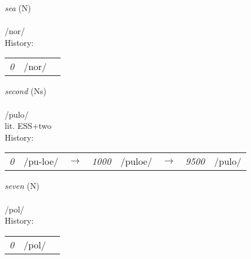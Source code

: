 \vspace{15pt}
\begin{nopagebreak}
 \textit{sea} (N)\\
\\
\noindent /n{\textprimstress}or/\\


\noindent History:

\vspace{-0pt}
\hspace{40pt}
\begin{tabular}{ccc}
\textit{0} & /nor/& \\
\end{tabular}

\vspace{20pt}\hline

\end{nopagebreak}
\filbreak



\vspace{15pt}
\begin{nopagebreak}
 \textit{second} (Ns)\\
\\
\noindent /p{\textprimstress}ulo/\\
\noindent lit. ESS+two\\


\noindent History:

\vspace{-0pt}
\hspace{40pt}
\begin{tabular}{ccc}
\textit{0} & /pu-loe/&$\rightarrow$ & \textit{1000} & /puloe/&$\rightarrow$ & \textit{9500} & /pulo/& \\
\end{tabular}

\vspace{20pt}\hline

\end{nopagebreak}
\filbreak



\vspace{15pt}
\begin{nopagebreak}
 \textit{seven} (N)\\
\\
\noindent /p{\textprimstress}ol/\\


\noindent History:

\vspace{-0pt}
\hspace{40pt}
\begin{tabular}{ccc}
\textit{0} & /pol/& \\
\end{tabular}

\vspace{20pt}\hline

\end{nopagebreak}
\filbreak



